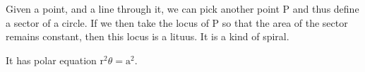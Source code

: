 Given a point, and a line through it, we can pick another point P and thus define a 
sector of a circle. If we then take the locus of P so that the area of the sector
remains constant, then this locus is a lituus. It is a kind of spiral.
\par
It has polar equation $ \mathrm{r}^2 \theta = \mathrm{a}^2 .$